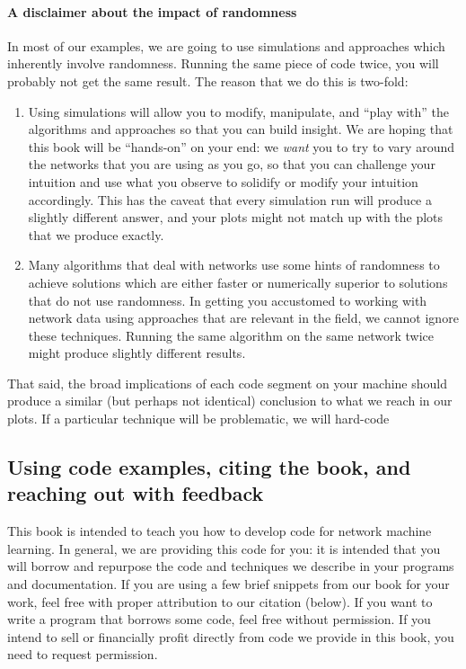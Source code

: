 \paragraph*{A disclaimer about the impact of randomness}

In most of our examples, we are going to use simulations and approaches which inherently involve randomness. Running the same piece of code twice, you will probably not get the same result. The reason that we do this is two-fold:
\begin{enumerate}
    \item Using simulations will allow you to modify, manipulate, and ``play with'' the algorithms and approaches so that you can build insight. We are hoping that this book will be ``hands-on'' on your end: we \textit{want} you to try to vary around the networks that you are using as you go, so that you can challenge your intuition and use what you observe to solidify or modify your intuition accordingly. This has the caveat that every simulation run will produce a slightly different answer, and your plots might not match up with the plots that we produce exactly.
    \item Many algorithms that deal with networks use some hints of randomness to achieve solutions which are either faster or numerically superior to solutions that do not use randomness. In getting you accustomed to working with network data using approaches that are relevant in the field, we cannot ignore these techniques. Running the same algorithm on the same network twice might produce slightly different results.
\end{enumerate}

That said, the broad implications of each code segment on your machine should produce a similar (but perhaps not identical) conclusion to what we reach in our plots. If a particular technique will be problematic, we will hard-code 


\subsection*{Using code examples, citing the book, and reaching out with feedback}

This book is intended to teach you how to develop code for network machine learning. In general, we are providing this code for you: it is intended that you will borrow and repurpose the code and techniques we describe in your programs and documentation. If you are using a few brief snippets from our book for your work, feel free with proper attribution to our citation (below). If you want to write a program that borrows some code, feel free without permission. If you intend to sell or financially profit directly from code we provide in this book, you need to request permission.

